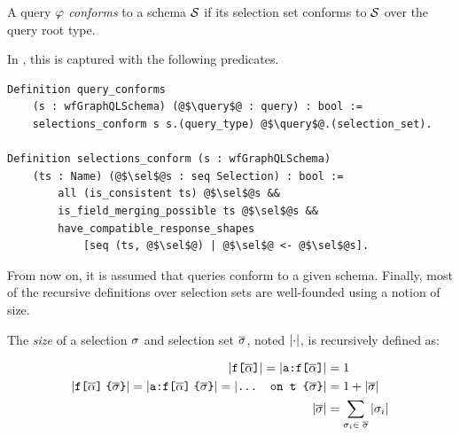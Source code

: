 \begin{definition}
A \gql query $\varphi$ \textit{conforms} to a schema $\mathcal{S}$ if its selection set conforms to $\mathcal{S}$ over the query root type.
\end{definition}


\noindent In \gcoql, this is captured with the following predicates.


\begin{verbatim}
Definition query_conforms 
    (s : wfGraphQLSchema) (@$\query$@ : query) : bool :=
    selections_conform s s.(query_type) @$\query$@.(selection_set).
    
Definition selections_conform (s : wfGraphQLSchema)
    (ts : Name) (@$\sel$@s : seq Selection) : bool :=
        all (is_consistent ts) @$\sel$@s &&
        is_field_merging_possible ts @$\sel$@s &&
        have_compatible_response_shapes
            [seq (ts, @$\sel$@) | @$\sel$@ <- @$\sel$@s].

\end{verbatim}

From now on, it is assumed that queries conform to a given schema. Finally, most of the recursive definitions over selection sets are well-founded using a notion of size.
\begin{definition}[adapted from \cite{gqlph}]
The \emph{size} of a selection $\sigma$ and selection set $\overline{\sigma}$, noted $\lvert \cdot \rvert$, is recursively defined as:
\begin{small}
\begin{align*}
    \lvert \texttt{f[}\overline{\alpha}\texttt{]} \rvert  = \lvert \texttt{a:}\texttt{f[}\overline{\alpha}\texttt{]} \rvert &=  1\\
    \lvert \texttt{f[}\overline{\alpha}\texttt{]}\; \texttt{\{}\overline{\sigma}\texttt{\}} \rvert = \lvert \texttt{a:}\texttt{f[}\overline{\alpha}\texttt{]}\; \texttt{\{}\overline{\sigma}\texttt{\}} \rvert = \lvert \texttt{... on t \{}\overline{\sigma}\texttt{\}} \rvert &= 1 + \lvert \overline{\sigma} \rvert\\
    \lvert \overline{\sigma} \rvert &= \sum_{\sigma_{i} \in\; \overline{\sigma}}{\lvert \sigma_{i} \rvert}
    \end{align*}
\end{small}
\end{definition} 

